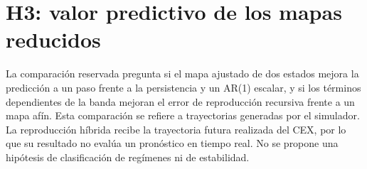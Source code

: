 \section{H3: valor predictivo de los mapas reducidos}

La comparación reservada pregunta si el mapa ajustado de dos estados mejora la predicción a un paso frente a la persistencia y un AR(1) escalar, y si los términos dependientes de la banda mejoran el error de reproducción recursiva frente a un mapa afín. Esta comparación se refiere a trayectorias generadas por el simulador. La reproducción híbrida recibe la trayectoria futura realizada del CEX, por lo que su resultado no evalúa un pronóstico en tiempo real. No se propone una hipótesis de clasificación de regímenes ni de estabilidad.
